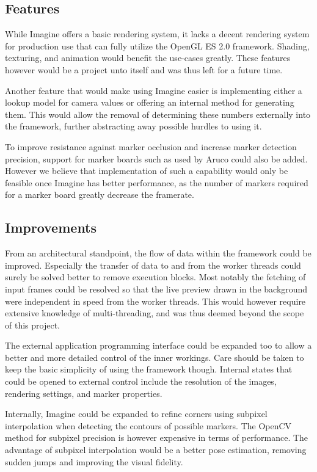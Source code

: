 \subsection{Features}

While Imagine offers a basic rendering system, it lacks a decent rendering system for production use that can fully utilize the OpenGL ES 2.0 framework.
Shading, texturing, and animation would benefit the use-cases greatly.
These features however would be a project unto itself and was thus left for a future time.

Another feature that would make using Imagine easier is implementing either a lookup model for camera values or offering an internal method for generating them.
This would allow the removal of determining these numbers externally into the framework, further abstracting away possible hurdles to using it.

To improve resistance against marker occlusion and increase marker detection precision, support for marker boards such as used by Aruco could also be added.
However we believe that implementation of such a capability would only be feasible once Imagine has better performance, as the number of markers required for a marker board greatly decrease the framerate.

\subsection{Improvements}
\label{improvements}

From an architectural standpoint, the flow of data within the framework could be improved.
Especially the transfer of data to and from the worker threads could surely be solved better to remove execution blocks.
Most notably the fetching of input frames could be resolved so that the live preview drawn in the background were independent in speed from the worker threads.
This would however require extensive knowledge of multi-threading, and was thus deemed beyond the scope of this project.

The external application programming interface could be expanded too to allow a better and more detailed control of the inner workings.
Care should be taken to keep the basic simplicity of using the framework though.
Internal states that could be opened to external control include the resolution of the images, rendering settings, and marker properties.

Internally, Imagine could be expanded to refine corners using subpixel interpolation when detecting the contours of possible markers.
The OpenCV method for subpixel precision is however expensive in terms of performance.
The advantage of subpixel interpolation would be a better pose estimation, removing sudden jumps and improving the visual fidelity.

